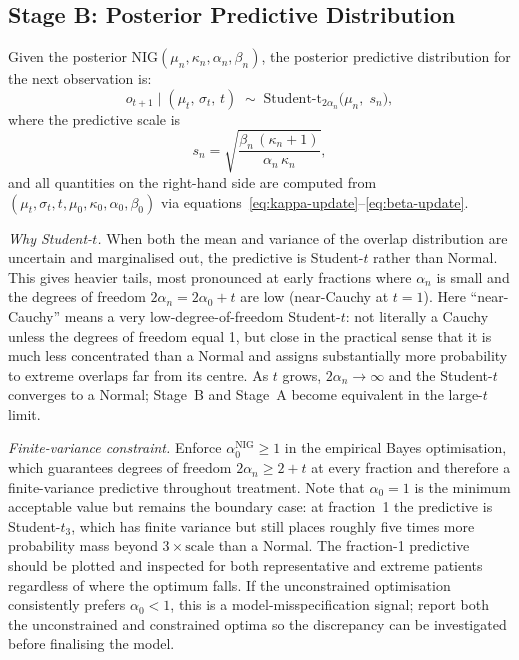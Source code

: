 \documentclass[11pt]{article}
\begin{document}
\subsection{Stage B: Posterior Predictive Distribution}

Given the posterior $\mathrm{NIG}(\mu_n, \kappa_n, \alpha_n, \beta_n)$, the posterior predictive distribution for the next observation is:
\begin{equation}
\label{eq:predictive-student-t}
o_{t+1} \mid (\mu_t,\,\sigma_t,\,t) \;\sim\; \mathrm{Student\text{-}t}_{2\alpha_n}\!\bigl(\mu_n,\; s_n\bigr),
\end{equation}
where the predictive scale is
\begin{equation}
\label{eq:predictive-scale}
s_n = \sqrt{\frac{\beta_n\,(\kappa_n+1)}{\alpha_n\,\kappa_n}},
\end{equation}
and all quantities on the right-hand side are computed from $(\mu_t, \sigma_t, t, \mu_0, \kappa_0, \alpha_0, \beta_0)$ via equations~\eqref{eq:kappa-update}--\eqref{eq:beta-update}.

\noindent\textit{Why Student-$t$.} When both the mean and variance of the overlap distribution are uncertain and marginalised out, the predictive is Student-$t$ rather than Normal. This gives heavier tails, most pronounced at early fractions where $\alpha_n$ is small and the degrees of freedom $2\alpha_n = 2\alpha_0 + t$ are low (near-Cauchy at $t=1$). Here ``near-Cauchy'' means a very low-degree-of-freedom Student-$t$: not literally a Cauchy unless the degrees of freedom equal 1, but close in the practical sense that it is much less concentrated than a Normal and assigns substantially more probability to extreme overlaps far from its centre. As $t$ grows, $2\alpha_n \to \infty$ and the Student-$t$ converges to a Normal; Stage~B and Stage~A become equivalent in the large-$t$ limit.

\noindent\textit{Finite-variance constraint.} Enforce $\alpha_0^{\mathrm{NIG}} \geq 1$ in the empirical Bayes optimisation, which guarantees degrees of freedom $2\alpha_n \geq 2+t$ at every fraction and therefore a finite-variance predictive throughout treatment. Note that $\alpha_0 = 1$ is the minimum acceptable value but remains the boundary case: at fraction~1 the predictive is Student-$t_3$, which has finite variance but still places roughly five times more probability mass beyond $3\times\text{scale}$ than a Normal. The fraction-1 predictive should be plotted and inspected for both representative and extreme patients regardless of where the optimum falls. If the unconstrained optimisation consistently prefers $\alpha_0 < 1$, this is a model-misspecification signal; report both the unconstrained and constrained optima so the discrepancy can be investigated before finalising the model.
\end{document}
